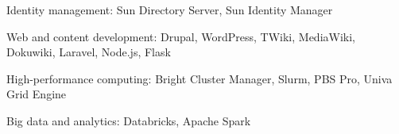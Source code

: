 \documentclass[10pt, a4paper, final]{article}
\begin{document}
\begin{section}
\begin{subsection}
\begin{compactitem}
      \item Identity management: Sun Directory Server, Sun Identity Manager
      \item Web and content development: Drupal, WordPress, TWiki, MediaWiki, Dokuwiki, Laravel, Node.js, Flask
      \item High-performance computing: Bright Cluster Manager, Slurm, PBS Pro, Univa Grid Engine
      \item Big data and analytics: Databricks, Apache Spark
    \end{compactitem}
  \end{subsection}
\end{section}
\end{document}
